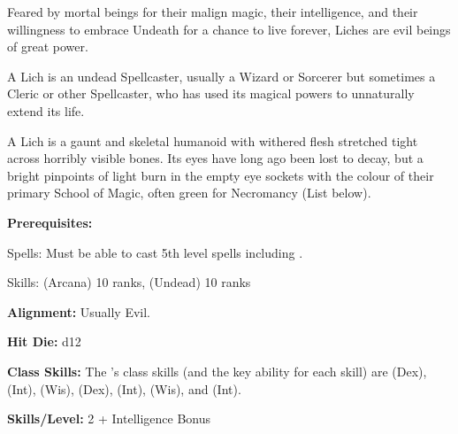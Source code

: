 
Feared by mortal beings for their malign magic, their intelligence, and their willingness to embrace Undeath for a chance to live forever, Liches are evil beings of great power.

A Lich is an undead Spellcaster, usually a Wizard or Sorcerer but sometimes a Cleric or other Spellcaster, who has used its magical powers to unnaturally extend its life.

A Lich is a gaunt and skeletal humanoid with withered flesh stretched tight across horribly visible bones. Its eyes have long ago been lost to decay, but a bright pinpoints of light burn in the empty eye sockets with the colour of their primary School of Magic, often green for Necromancy (List below).

\textbf{Prerequisites:} 
\begin{description*}
\item[\hspace*{1.5cm}Spells:] Must be able to cast 5th level spells including .
\item[\hspace*{1.5cm}Skills:]  (Arcana) 10 ranks,  (Undead) 10 ranks
\end{description*}

\textbf{Alignment:} Usually Evil.

\textbf{Hit Die:} d12

\textbf{Class Skills:} The \currentclassname{}'s class skills (and the key ability for each skill) are  (Dex),  (Int),  (Wis),  (Dex),  (Int),  (Wis), and  (Int).

\textbf{Skills/Level:} 2 + Intelligence Bonus

\poorbab{}
\poorfor{}
\poorref{}
\goodwil{}

